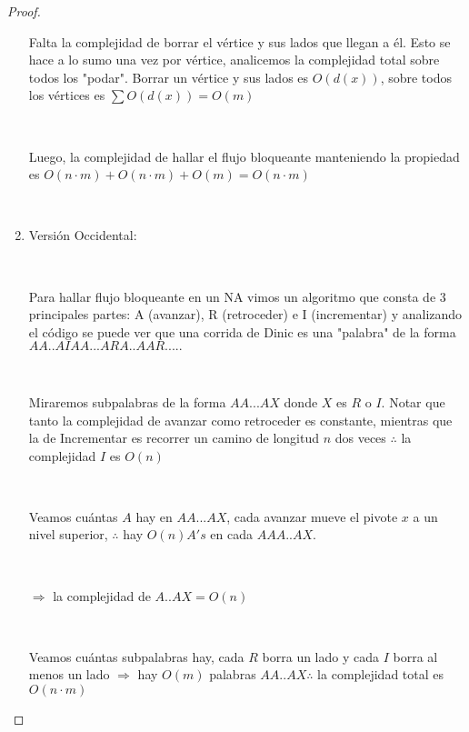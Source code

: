 \documentclass[11pt]{article}
\begin{document}
\begin{proof}
\begin{enumerate}
Falta la complejidad de borrar el vértice y sus lados que llegan a él. Esto se hace a lo sumo una vez por vértice, analicemos la complejidad total sobre todos los "podar". Borrar un vértice y sus lados es $O(d(x))$, sobre todos los vértices es $\sum O(d(x)) = O(m)$ \par
\

Luego, la complejidad de hallar el flujo bloqueante manteniendo la propiedad es $O(n \cdot m) + O(n \cdot m) + O(m) = O(n \cdot m)$\par
\

\item Versión Occidental:\par
\

Para hallar flujo bloqueante en un NA vimos un algoritmo que consta de 3 principales partes: A (avanzar), R (retroceder) e I (incrementar) y analizando el código se puede ver que una corrida de Dinic es una "palabra" de la forma $AA..AIAA...ARA..AAR.....$\par
\

Miraremos subpalabras de la forma $AA...AX$ donde $X$ es $R$ o $I$. Notar que tanto la complejidad de avanzar como retroceder es constante, mientras que la de Incrementar es recorrer un camino de longitud $n$ dos veces $\therefore$ la complejidad $I$ es $O(n)$\par
\

Veamos cuántas $A$ hay en $AA...AX$, cada avanzar mueve el pivote $x$ a un nivel superior, $\therefore$ hay $O(n) A's$ en cada $AAA..AX$.\par
\

$\Rightarrow$ la complejidad de $A..AX = O(n)$\par
\

Veamos cuántas subpalabras hay, cada $R$ borra un lado y cada $I$ borra al menos un lado $\Rightarrow$ hay $O(m)$ palabras $AA..AX \therefore$ la complejidad total es $O(n \cdot m)$
 
 

\end{enumerate}

\end{proof}
\end{document}
